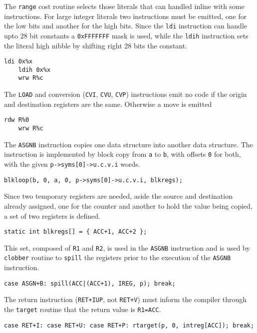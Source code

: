 The {\tt range} cost routine selects those literals that can handled
inline with some instructions.
For large integer literals two instructions must be emitted,
one for the low bits and another for the high bits.
Since the {\tt ldi} instruction can handle upto $28$ bit constants a
{\tt 0xFFFFFFF} mask is used, while the {\tt ldih} instruction sets
the literal high nibble by shifting right $28$ bits the constant.
\begin{Verbatim}[baselinestretch=1.2]
    ldi 0x%x
    ldih 0x%x
    wrw R%c
\end{Verbatim}

The {\tt LOAD} and conversion ({\tt CVI}, {\tt CVU}, {\tt CVP})
instructions emit no code if the origin and destination
registers are the same. Otherwise a move is emitted
\begin{Verbatim}[baselinestretch=1.2]
    rdw R%0
    wrw R%c
\end{Verbatim}

The {\tt ASGNB} instruction copies one data structure
into another data structure.
The instruction is implemented by block copy from
{\tt a} to {\tt b}, with offsets {\tt 0} for both, with the
given {\tt p->syms[0]->u.c.v.i} words.
\begin{Verbatim}[baselinestretch=1.2]
blkloop(b, 0, a, 0, p->syms[0]->u.c.v.i, blkregs);
\end{Verbatim}

Since two temporary registers are needed, aside
the source and destination already assigned,
one for the counter and another to hold the
value being copied, a set of two registers is
defined.
\begin{Verbatim}[baselinestretch=1.2]
static int blkregs[] = { ACC+1, ACC+2 };
\end{Verbatim}

This set, composed of {\tt R1} and {\tt R2},
is used in the {\tt ASGNB} instruction
and is used by {\tt clobber} routine to {\tt spill}
the registers prior to the execution of the
{\tt ASGNB} instruction.
\begin{Verbatim}[baselinestretch=1.2]
case ASGN+B: spill(ACC|(ACC+1), IREG, p); break;
\end{Verbatim}

The return instruction ({\tt RET+IUP}, not {\tt RET+V})
must inform the compiler through the {\tt target} routine
that the return value is {\tt R1=ACC}.
\begin{Verbatim}[baselinestretch=1.2]
case RET+I: case RET+U: case RET+P: rtarget(p, 0, intreg[ACC]); break;
\end{Verbatim}

